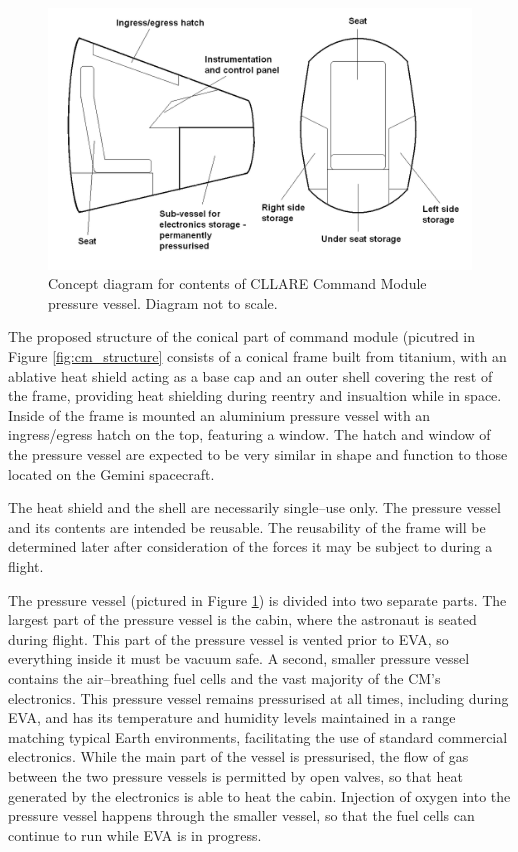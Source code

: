 \documentclass{report}
\begin{document}
\begin{figure}[ht] \label{fig:cm_internals}
\centering
\includegraphics[scale=0.3]{images/cllare_cm_pressure_vessel_contents}
\caption{Concept diagram for contents of CLLARE Command Module pressure vessel.  Diagram not to scale.}
\end{figure}

The proposed structure of the conical part of command module (picutred in Figure \ref{fig:cm_structure} consists of a conical frame built from titanium, with an ablative heat shield acting as a base cap and an outer shell covering the rest of the frame, providing heat shielding during reentry and insualtion while in space.  Inside of the frame is mounted an aluminium pressure vessel with an ingress/egress hatch on the top, featuring a window.  The hatch and window of the pressure vessel are expected to be very similar in shape and function to those located on the Gemini spacecraft.

The heat shield and the shell are necessarily single--use only.  The pressure vessel and its contents are intended be reusable.  The reusability of the frame will be determined later after consideration of the forces it may be subject to during a flight.

The pressure vessel (pictured in Figure \ref{fig:cm_internals}) is divided into two separate parts.  The largest part of the pressure vessel is the cabin, where the astronaut is seated during flight.  This part of the pressure vessel is vented prior to EVA, so everything inside it must be vacuum safe.  A second, smaller pressure vessel contains the air--breathing fuel cells and the vast majority of the CM's electronics.  This pressure vessel remains pressurised at all times, including during EVA, and has its temperature and humidity levels maintained in a range matching typical Earth environments, facilitating the use of standard commercial electronics.  While the main part of the vessel is pressurised, the flow of gas between the two pressure vessels is permitted by open valves, so that heat generated by the electronics is able to heat the cabin.  Injection of oxygen into the pressure vessel happens through the smaller vessel, so that the fuel cells can continue to run while EVA is in progress.
\end{document}
